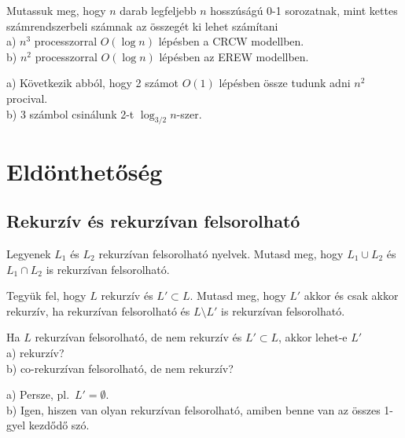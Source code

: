 \begin{Exercise}[counter={sorszam}, difficulty=0]
	Mutassuk meg, hogy $n$ darab legfeljebb $n$ hosszúságú 0-1 sorozatnak, mint kettes számrendszerbeli számnak az összegét ki lehet számítani\\
	a) $n^3$ processzorral $O(\log n)$ lépésben a CRCW modellben.\\
	b) $n^2$ processzorral $O(\log n)$ lépésben az EREW modellben.
\end{Exercise}	
\begin{Answer}
	a) K\"ovetkezik abb\'ol, hogy 2 sz\'amot $O(1)$ l\'ep\'esben \"ossze tudunk adni $n^2$ procival.\\
	b) 3 sz\'ambol csin\'alunk 2-t $\log_{3/2} n$-szer.
\end{Answer}	














\chapter{Eld\"onthet\H os\'eg}

\section{Rekurz\'iv \'es rekurz\'ivan felsorolhat\'o}

\begin{Exercise}[counter={sorszam}, difficulty=0]
	Legyenek $L_1$ \'es $L_2$ rekurz\'ivan felsorolhat\'o nyelvek. Mutasd meg, hogy $L_1 \cup L_2$ \'es $L_1 \cap L_2$ is rekurz\'ivan felsorolhat\'o.
\end{Exercise}	

\begin{Exercise}[counter={sorszam}, difficulty=0]
	Tegy\"uk fel, hogy $L$ rekurz\'iv \'es $L'\subset L$. Mutasd meg, hogy $L'$ akkor \'es csak akkor rekurz\'iv, ha rekurz\'ivan felsorolhat\'o \'es $L\setminus L'$ is rekurz\'ivan felsorolhat\'o. 
\end{Exercise}	


\begin{Exercise}[counter={sorszam}, difficulty=0]
	Ha $L$ rekurz\'ivan felsorolhat\'o, de nem rekurz\'iv \'es $L'\subset L$, akkor lehet-e $L'$\\
	a) rekurz\'iv?\\
	b) co-rekurz\'ivan felsorolhat\'o, de nem rekurz\'iv?
\end{Exercise}	
\begin{Answer}
	a) Persze, pl.\ $L'=\emptyset$.\\
	b) Igen, hiszen van olyan rekurz\'ivan felsorolhat\'o, amiben benne van az \"osszes 1-gyel kezd\H od\H o sz\'o.
\end{Answer}


